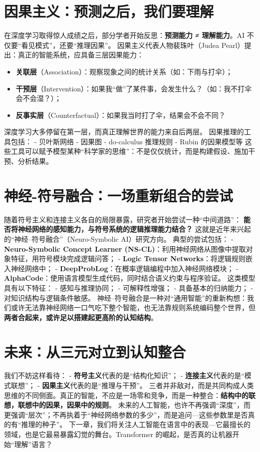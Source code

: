 \section*{因果主义：预测之后，我们要理解}
在深度学习取得惊人成绩之后，部分学者开始反思：\textbf{预测能力 ≠ 理解能力}。AI 不仅要“看见模式”，还要“推理因果”。
因果主义代表人物裴珠叶（Judea Pearl）提出：真正的智能系统，应具备三层因果能力：
\begin{itemize}
\item \textbf{关联层}（Association）：观察现象之间的统计关系（如：下雨与打伞）；
\item \textbf{干预层}（Intervention）：如果我“做”了某件事，会发生什么？（如：我不打伞会不会湿？）；
\item \textbf{反事实层}（Counterfactual）：如果我当时打了伞，结果会不会不同？
\end{itemize}
深度学习大多停留在第一层，而真正理解世界的能力来自后两层。
因果推理的工具包括：
- 贝叶斯网络
- 因果图
- do-calculus 推理规则
- Rubin 的因果模型等
这些工具可以赋予模型某种“科学家的思维”：不是仅仅统计，而是构建假设、施加干预、分析结果。
\section*{神经-符号融合：一场重新组合的尝试}
随着符号主义和连接主义各自的局限暴露，研究者开始尝试一种“中间道路”：
\textbf{能否将神经网络的感知能力，与符号系统的逻辑推理能力结合？}
这就是近年来兴起的“神经–符号融合”（Neuro-Symbolic AI）研究方向。
典型的尝试包括：
- \textbf{Neuro-Symbolic Concept Learner (NS-CL)}：利用神经网络从图像中提取对象特征，用符号模块完成逻辑问答；
- \textbf{Logic Tensor Networks}：将逻辑规则嵌入神经网络中；
- \textbf{DeepProbLog}：在概率逻辑编程中加入神经网络模块；
- \textbf{AlphaCode}：使用语言模型生成代码，同时结合语义约束与程序验证。
这类模型具有以下特征：
- 感知与推理协同；
- 可解释性增强；
- 具备基本的归纳能力；
- 对知识结构与逻辑条件敏感。
神经–符号融合是一种对“通用智能”的重新构想：我们或许无法靠神经网络一口气吃下整个智能，也无法靠规则系统编码整个世界，但\textbf{两者合起来，或许足以搭建起更高阶的认知结构}。
\section*{未来：从三元对立到认知整合}
我们不妨这样看待：
- \textbf{符号主义}代表的是“结构化知识”；
- \textbf{连接主义}代表的是“模式联想”；
- \textbf{因果主义}代表的是“推理与干预”。
三者并非敌对，而是共同构成人类思维的不同侧面。真正的智能，不应是一场零和竞争，而是一种整合：\textbf{结构中的联想，联想中的因果，因果中的规则}。
未来的人工智能，也许不再强调“深度”，而更强调“层次”；不再执着于“神经网络参数的多少”，而是追问---这些参数里是否真的有“推理的种子”。
下一章，我们将关注人工智能在语言中的表现---它最擅长的领域，也是它最易暴露幻觉的舞台。Transformer 的崛起，是否真的让机器开始“理解”语言？
\nocite{*}
\printbibliography[heading=bibintoc, title=\ebibname]
\newpage



